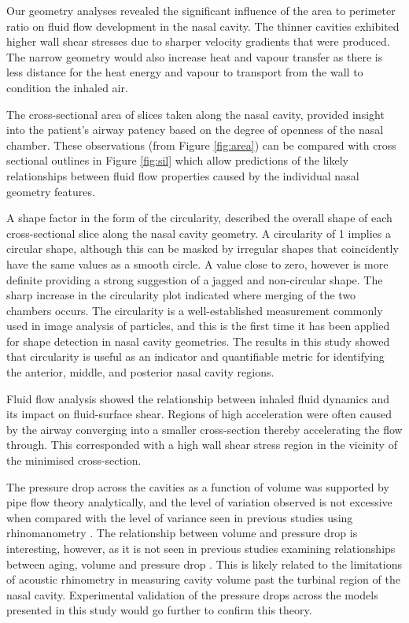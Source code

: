 Our geometry analyses revealed the significant influence of the area to perimeter ratio on fluid flow development in the nasal cavity. The thinner cavities exhibited higher wall shear stresses due to sharper velocity gradients that were produced. The narrow geometry would also increase heat and vapour transfer as there is less distance for the heat energy and vapour to transport from the wall to condition the inhaled air.

The cross-sectional area of slices taken along the nasal cavity, provided insight into the patient’s airway patency based on the degree of openness of the nasal chamber. These observations (from Figure \ref{fig:area}) can be compared with cross sectional outlines in Figure \ref{fig:sil} which allow predictions of the likely relationships between fluid flow properties caused by the individual nasal geometry features.

A shape factor in the form of the circularity,   described the overall shape of each cross-sectional slice along the nasal cavity geometry. A circularity of 1 implies a circular shape, although this can be masked by irregular shapes that coincidently have the same values as a smooth circle. A value close to zero, however is more definite providing a strong suggestion of a jagged and non-circular shape. The sharp increase in the circularity plot indicated where merging of the two chambers occurs. The circularity is a well-established measurement commonly used in image analysis of particles, and this is the first time it has been applied for shape detection in nasal cavity geometries. The results in this study showed that circularity is useful as an indicator and quantifiable metric for identifying the anterior, middle, and posterior nasal cavity regions.

Fluid flow analysis showed the relationship between inhaled fluid dynamics and its impact on fluid-surface shear. Regions of high acceleration were often caused by the airway converging into a smaller cross-section thereby accelerating the flow through.  This corresponded with a high wall shear stress region in the vicinity of the minimised cross-section. 

The pressure drop across the cavities as a function of volume was supported by pipe flow theory analytically, and the level of variation observed is not excessive when compared with the level of variance seen in previous studies using rhinomanometry \cite{Edelstein1996}. The relationship between volume and pressure drop is interesting, however, as it is not seen in previous studies examining relationships between aging, volume and pressure drop \cite{Lindemann2008}. This is likely related to the limitations of acoustic rhinometry in measuring cavity volume past the turbinal region of the nasal cavity. Experimental validation of the pressure drops across the models presented in this study would go further to confirm this theory.


